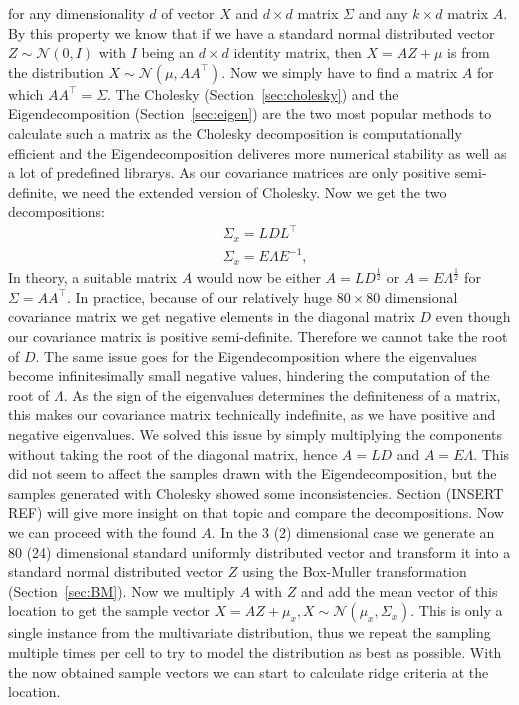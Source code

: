 \noindent for any dimensionality $d$ of vector $X$ and $d \times d$
matrix $\Sigma$ and any $k \times d$ matrix $A$. By this property we
know that if we have a standard normal distributed vector $Z \sim
\mathcal{N}(0,I)$ with $I$ being an $d \times d$ identity matrix, then
$X = AZ + \mu$ is from the distribution $X \sim \mathcal{N}(\mu, A
A^\top)$. Now we simply have to find a matrix $A$ for which $AA^\top =
\Sigma$. The Cholesky (Section~\ref{sec:cholesky}) and the
Eigendecomposition (Section~\ref{sec:eigen}) are the two most popular
methods to calculate such a matrix as the Cholesky decomposition is
computationally efficient and the Eigendecomposition deliveres more
numerical stability as well as a lot of predefined librarys. As our
covariance matrices are only positive semi-definite, we need the
extended version of Cholesky. Now we get the two decompositions:
\begin{align}
    &\Sigma_x = L D L^\top \\
    &\Sigma_x = E \Lambda E^{-1},
\end{align}
In theory, a suitable matrix $A$ would now be either $A=L
D^{\frac{1}{2}}$ or $A=E\Lambda^{\frac{1}{2}}$ for $\Sigma = AA^\top$.
In practice, because of our relatively huge $80 \times 80$ dimensional
covariance matrix we get negative elements in the diagonal matrix $D$
even though our covariance matrix is positive semi-definite. Therefore
we cannot take the root of $D$. The same issue goes for the
Eigendecomposition where the eigenvalues become infinitesimally small
negative values, hindering the computation of the root of $\Lambda$. As
the sign of the eigenvalues determines the definiteness of a matrix,
this makes our covariance matrix technically indefinite, as we have
positive and negative eigenvalues. We solved this issue by simply
multiplying the components without taking the root of the diagonal
matrix, hence $A = LD$ and $A = E \Lambda$. This did not seem to affect
the samples drawn with the Eigendecomposition, but the samples generated
with Cholesky showed some inconsistencies. Section (INSERT REF) will
give more insight on that topic and compare the decompositions. Now we
can proceed with the found $A$. In the 3 (2) dimensional  case we
generate an 80 (24) dimensional standard uniformly distributed vector
and transform it into a standard normal distributed vector $Z$ using the
Box-Muller transformation (Section~\ref{sec:BM}). Now we multiply $A$
with $Z$ and add the mean vector of this location to get the sample
vector $X = AZ + \mu_x, X \sim \mathcal{N}(\mu_x, \Sigma_x)$. This is
only a single instance from the multivariate distribution, thus we
repeat the sampling multiple times per cell to try to model the
distribution as best as possible. With the now obtained sample vectors
we can start to calculate ridge criteria at the location.

